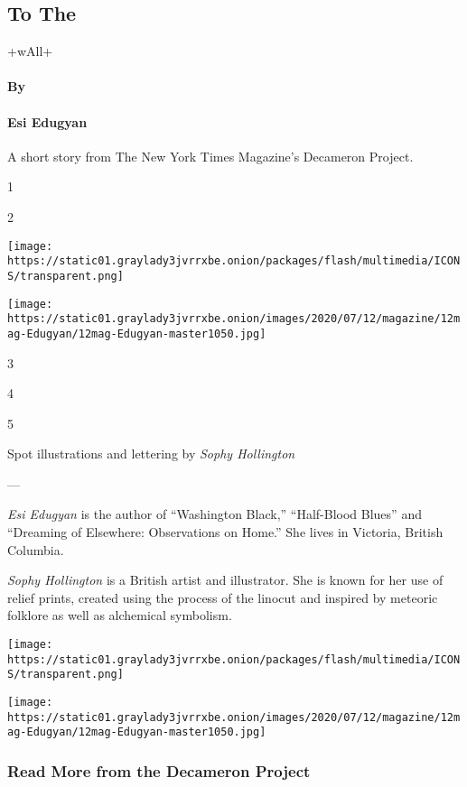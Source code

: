 \hypertarget{to-the}{%
\subsection{To The}\label{to-the}}

+wAll+

\hypertarget{by}{%
\paragraph{By}\label{by}}

\hypertarget{esi-edugyan}{%
\paragraph{Esi Edugyan}\label{esi-edugyan}}

A short story from The New York Times Magazine's Decameron Project.

1

2

\texttt{[image: https://static01.graylady3jvrrxbe.onion/packages/flash/multimedia/ICONS/transparent.png]}

\texttt{[image: https://static01.graylady3jvrrxbe.onion/images/2020/07/12/magazine/12mag-Edugyan/12mag-Edugyan-master1050.jpg]}

3

4

5

Spot illustrations and lettering by \emph{Sophy Hollington}

---

\emph{Esi Edugyan} is the author of ``Washington Black,'' ``Half-Blood
Blues'' and ``Dreaming of Elsewhere: Observations on Home.'' She lives
in Victoria, British Columbia.

\emph{Sophy Hollington} is a British artist and illustrator. She is
known for her use of relief prints, created using the process of the
linocut and inspired by meteoric folklore as well as alchemical
symbolism.

\texttt{[image: https://static01.graylady3jvrrxbe.onion/packages/flash/multimedia/ICONS/transparent.png]}

\texttt{[image: https://static01.graylady3jvrrxbe.onion/images/2020/07/12/magazine/12mag-Edugyan/12mag-Edugyan-master1050.jpg]}

\hypertarget{read-more-from-the-decameron-project}{%
\subsubsection{Read More from the Decameron
Project}\label{read-more-from-the-decameron-project}}

